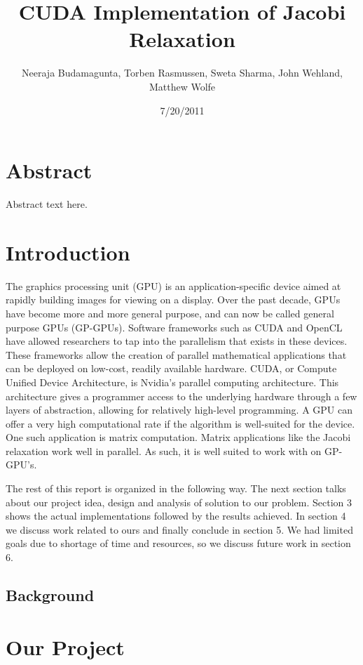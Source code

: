 \documentclass[10pt]{article}
\title{CUDA Implementation of Jacobi Relaxation}
\author{Neeraja Budamagunta, Torben Rasmussen, Sweta Sharma, John Wehland, Matthew Wolfe}
\date{7/20/2011}
\begin{document}
\maketitle
\begin{multicols}{2}
\section{Abstract}
Abstract text here.
\section{Introduction} %
The graphics processing unit (GPU) is an application-specific device aimed at rapidly building images for viewing on a display.
Over the past decade, GPUs have become more and more general purpose, and can now be called general purpose GPUs (GP-GPUs).
Software frameworks such as CUDA and OpenCL have allowed researchers to tap into the parallelism that exists in these devices.
These frameworks allow the creation of parallel mathematical applications that can be deployed on low-cost, readily available hardware.
CUDA, or Compute Unified Device Architecture, is Nvidia's parallel computing architecture.
This architecture gives a programmer access to the underlying hardware through a few layers of abstraction, allowing for relatively high-level programming.
A GPU can offer a very high computational rate if the algorithm is well-suited for the device.
One such application is matrix computation.
Matrix applications like the Jacobi relaxation work well in parallel.
As such, it is well suited to work with on GP-GPU’s.

The rest of this report is organized in the following way.
The next section talks about our project idea, design and analysis of solution to our problem.
Section 3 shows the actual implementations followed by the results achieved.
In section 4 we discuss work related to ours and finally conclude in section 5.
We had limited goals due to shortage of time and resources, so we discuss future work in section 6.

    \subsection{Background} %

\section{Our Project}

\end{multicols}
\end{document}
